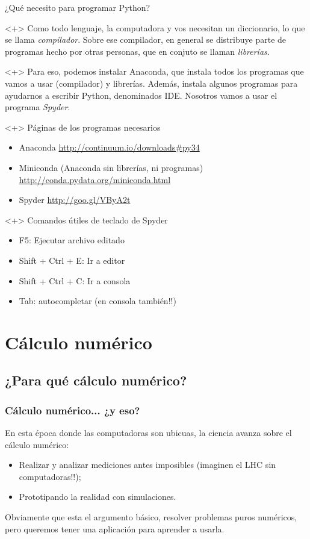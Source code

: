 \documentclass{beamer}
\begin{document}
\begin{frame}[fragile]{¿Qué necesito para programar Python?}
  \begin{onlyenv}<+>
 Como todo lenguaje, la computadora y vos necesitan un diccionario, lo que se llama \emph{compilador}. Sobre ese compilador, en general se distribuye parte de programas hecho por otras personas, que en conjuto se llaman \emph{librerías}.
 \end{onlyenv}
 \begin{onlyenv}<+>
 Para eso, podemos instalar Anaconda, que instala todos los programas que vamos a usar (compilador) y librerías. Además, instala algunos programas para ayudarnos a escribir Python, denominados IDE. Nosotros vamos a usar el programa \emph{Spyder}.
 \end{onlyenv}
 \begin{onlyenv}<+>
    Páginas de los programas necesarios
    \begin{itemize}
    \item{Anaconda \url{http://continuum.io/downloads#py34}}
    \item{Miniconda (Anaconda sin librerías, ni programas) \url{http://conda.pydata.org/miniconda.html}}
    \item{Spyder \url{http://goo.gl/VByA2t}}
    \end{itemize}
 \end{onlyenv}
 \begin{onlyenv}<+>
    Comandos útiles de teclado de Spyder
    \begin{itemize}
    \item F5: Ejecutar archivo editado
    \item Shift + Ctrl + E: Ir a editor
    \item Shift + Ctrl + C: Ir a consola
    \item Tab: autocompletar (en consola también!!)
    \end{itemize}
 \end{onlyenv}
\end{frame}

\section{Cálculo numérico}

\subsection{¿Para qué cálculo numérico?}
\begin{frame}
    \frametitle{Cálculo numérico... ¿y eso?}
    En esta época donde las computadoras son ubicuas, la ciencia avanza sobre el cálculo numérico:
    \begin{itemize}
    \item Realizar y analizar mediciones antes imposibles (imaginen el LHC sin computadoras!!);
    \item Prototipando la realidad con simulaciones.
    \end{itemize}
    Obviamente que esta el argumento básico, resolver problemas puros numéricos, pero queremos tener una aplicación para aprender a usarla.
    
\end{frame}
\end{document}
